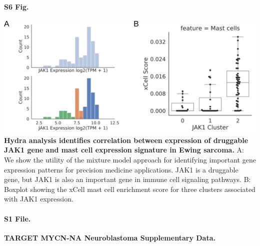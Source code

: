 \documentclass[10pt,letterpaper]{article}
\begin{document}
\paragraph*{S6 Fig.}
\includegraphics[width=\textwidth]{img/PNG/ewing-jak1-expression-fig}
\label{S6_Fig} {\bf Hydra analysis identifies correlation between expression of druggable JAK1 gene and mast cell expression signature in Ewing sarcoma.} A: We show the utility of the mixture model approach for identifying important gene expression patterns for precision medicine applications. JAK1 is a druggable gene, but JAK1 is also an important gene in immune cell signaling pathways. B: Boxplot showing the xCell mast cell enrichment score for three clusters associated with JAK1 expression.



\paragraph*{S1 File.}
\label{S1_File}
{\bf TARGET MYCN-NA Neuroblastoma Supplementary Data.}


\end{document}
